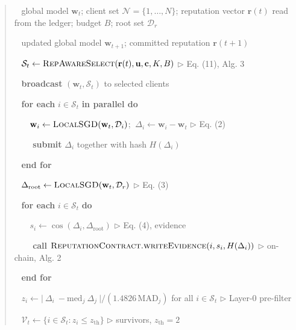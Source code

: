 \documentclass[cmc,article,submit,moreauthors,pdftex]{Definitions/tsp}
\begin{document}
\begin{quote}
\noindent{}~ global model $\mathbf{w}_t$; client set $\mathcal{N}=\{1,\dots,N\}$; reputation vector $\mathbf{r}(t)$ read from the ledger; budget $B$; root set $\mathcal{D}_r$

\noindent{}~ updated global model $\mathbf{w}_{t+1}$; committed reputation $\mathbf{r}(t+1)$

\noindent{}~ $\mathcal{S}_t \leftarrow \textsc{RepAwareSelect}(\mathbf{r}(t), \mathbf{u}, \mathbf{c}, K, B)$  $\triangleright$ Eq. (11), Alg. 3

\noindent{}~ \textbf{broadcast} $(\mathbf{w}_t, \mathcal{S}_t)$ to selected clients

\noindent{}~ \textbf{for each} $i \in \mathcal{S}_t$ \textbf{in parallel do}

\noindent{}~ $\quad \mathbf{w}_i \leftarrow \textsc{LocalSGD}(\mathbf{w}_t, \mathcal{D}_i)$; $\ \Delta_i \leftarrow \mathbf{w}_i - \mathbf{w}_t$  $\triangleright$ Eq. (2)

\noindent{}~ $\quad$ \textbf{submit} $\Delta_i$ together with hash $H(\Delta_i)$

\noindent{}~ \textbf{end for}

\noindent{}~ $\Delta_{\mathrm{root}} \leftarrow \textsc{LocalSGD}(\mathbf{w}_t, \mathcal{D}_r)$  $\triangleright$ Eq. (3)

\noindent{}~ \textbf{for each} $i \in \mathcal{S}_t$ \textbf{do}

\noindent{}~ $\quad s_i \leftarrow \cos(\Delta_i, \Delta_{\mathrm{root}})$  $\triangleright$ Eq. (4), evidence

\noindent{}~ $\quad$ \textbf{call} $\textsc{ReputationContract.writeEvidence}(i, s_i, H(\Delta_i))$  $\triangleright$ on-chain, Alg. 2

\noindent{}~ \textbf{end for}

\noindent{}~ $z_i \leftarrow \bigl\lvert \ \Delta_i\ - \mathrm{med}_j\ \Delta_j\ \bigr\rvert / (1.4826\,\mathrm{MAD}_j)$ for all $i \in \mathcal{S}_t$  $\triangleright$ Layer-0 pre-filter

\noindent{}~ $\mathcal{V}_t \leftarrow \{i \in \mathcal{S}_t : z_i \leq z_{\mathrm{th}}\}$  $\triangleright$ survivors, $z_{\mathrm{th}}=2$


\end{quote}
\end{document}
